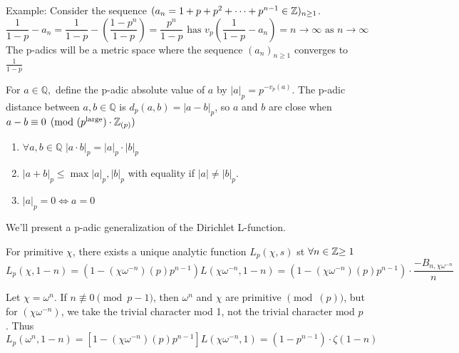 Example: Consider the sequence $(a_n=1+p+p^2+\cdots+p^{n-1}\in\mathbb{Z})_{n\geq 1}$.
\[
    \frac{1}{1-p}-a_n=\frac{1}{1-p} -(\frac{1-p^n}{1-p})=\frac{p^n}{1-p} 
    \text{ has }v_p(\frac{1}{1-p}-a_n)=n \rightarrow \infty \text{ as }n\rightarrow \infty
\]      
The p-adics will be a metric space where the sequence $(a_n)_{n\geq 1}$ converges to $\frac{1}{1-p}$
\begin{definition}
    For $a\in\mathbb{Q},$ define the p-adic absolute value of $a$ by $|a|_p=p^{-v_p(a)}$. The p-adic
    distance between $a,b\in\mathbb{Q}$ is $d_p(a,b)=|a-b|_p$, so $a$ and $b$ are close when 
    $a-b\equiv 0 \pmod{(p^{\text{large}})\cdot \mathbb{Z}_{(p)}}$
\end{definition}

\begin{lemma} 
    \begin{enumerate}
        \item  $\forall a,b \in \mathbb{Q}$ $|a\cdot b|_p=|a|_p\cdot |b|_p$
        \item $|a+b|_p\leq\max{|a|_p,|b|_p}$ with equality if $|a|\neq |b|_p$.
        \item $|a|_p=0 \iff a=0$
    \end{enumerate}
\end{lemma}
We'll present a p-adic generalization of the Dirichlet L-function.
\begin{theorem}
    For primitive $\chi$, there exists a unique analytic function $L_p(\chi,s)$
    st $\forall n\in\mathbb{Z}{\geq 1}$
    \[
        L_p(\chi,1-n)=(1-(\chi\omega^{-n})(p)p^{n-1})L(\chi\omega^{-n},1-n)  
        =(1-(\chi\omega^{-n})(p)p^{n-1})\cdot\frac{-B_{n,\chi\omega^{-n}}}{n}
    \]
\end{theorem}
\begin{example}
    Let $\chi=\omega^n$. If $n\not\equiv 0\pmod{p-1}$, then $\omega^n$ and $\chi$
    are primitive $\pmod(p)$, but for $(\chi\omega^{-n})$, we take the trivial character
    mod 1, not the trivial character mod $p$.
    Thus
    \[
        L_p(\omega^n,1-n)=[1-(\chi\omega^{-n})(p)p^{n-1}]L(\chi\omega^{-n},1)
        =(1-p^{n-1})\cdot\zeta(1-n)  
    \]
\end{example}
